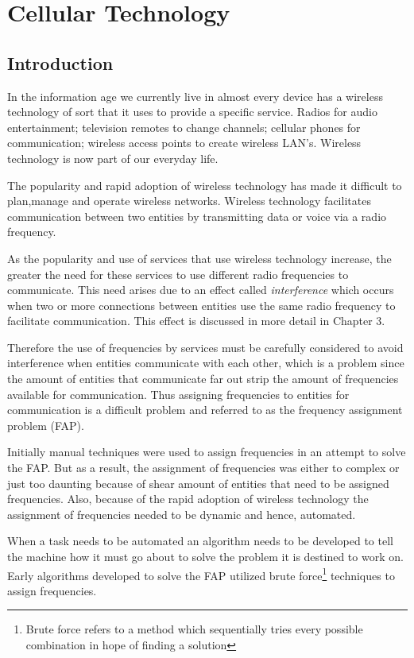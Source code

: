 \chapter{Cellular Technology}
\label{chpt:celltech}
\section{Introduction}
In the information age we currently live in almost every device has a wireless technology of sort that it uses to provide a specific service. Radios for audio entertainment; television remotes to change 
channels; cellular phones for communication; wireless access points to create wireless LAN's\cite{Karen2004}. Wireless technology is now part of our everyday life.

The popularity and rapid adoption of wireless technology has made it difficult to plan,manage and operate wireless networks. Wireless technology facilitates communication between two entities by transmitting data or voice via a radio frequency. 

As the popularity and use of services that use wireless technology increase, the greater the need for these services to use different radio frequencies to communicate. This need arises due to an effect called \emph{interference} which occurs when two or more connections between entities use the same radio frequency to facilitate communication. This effect is discussed in more detail in Chapter 3.

Therefore the use of frequencies by services must be carefully considered to avoid interference when entities communicate with each other, which is a problem since the amount of entities that communicate far out strip the amount of frequencies available for communication. Thus assigning frequencies to entities for communication is a difficult problem and referred to as the frequency assignment problem (FAP).

Initially manual techniques were used to assign frequencies in an attempt to solve the FAP. But as a result, the assignment of frequencies was either to complex or just too daunting because of shear amount of entities that need to be assigned frequencies. Also, because of the rapid adoption of wireless technology the assignment of frequencies needed to be dynamic and hence, automated.

When a task needs to be automated an algorithm needs to be developed to tell the machine how it must go about to solve the problem it is destined to work on. Early algorithms developed to solve the FAP utilized brute force\footnote{Brute force refers to a method which sequentially tries every possible combination in hope of finding a solution} techniques to assign frequencies.

